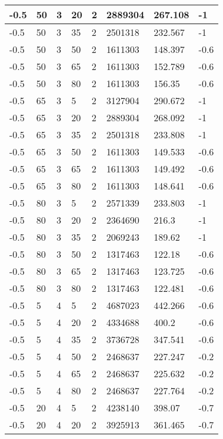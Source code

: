 \begin{longtable}{|p{1.4cm}|p{1.4cm}|p{1.4cm}|p{1.4cm}|p{1.4cm}|p{1.4cm}|p{1.4cm}|p{1.5cm}|}
        -0.5 & 50 & 3 & 20 & 2 & 2889304 & 267.108 & -1 \\ \hline
        -0.5 & 50 & 3 & 35 & 2 & 2501318 & 232.567 & -1 \\ \hline
        -0.5 & 50 & 3 & 50 & 2 & 1611303 & 148.397 & -0.6 \\ \hline
        -0.5 & 50 & 3 & 65 & 2 & 1611303 & 152.789 & -0.6 \\ \hline
        -0.5 & 50 & 3 & 80 & 2 & 1611303 & 156.35 & -0.6 \\ \hline
        -0.5 & 65 & 3 & 5 & 2 & 3127904 & 290.672 & -1 \\ \hline
        -0.5 & 65 & 3 & 20 & 2 & 2889304 & 268.092 & -1 \\ \hline
        -0.5 & 65 & 3 & 35 & 2 & 2501318 & 233.808 & -1 \\ \hline
        -0.5 & 65 & 3 & 50 & 2 & 1611303 & 149.533 & -0.6 \\ \hline
        -0.5 & 65 & 3 & 65 & 2 & 1611303 & 149.492 & -0.6 \\ \hline
        -0.5 & 65 & 3 & 80 & 2 & 1611303 & 148.641 & -0.6 \\ \hline
        -0.5 & 80 & 3 & 5 & 2 & 2571339 & 233.803 & -1 \\ \hline
        -0.5 & 80 & 3 & 20 & 2 & 2364690 & 216.3 & -1 \\ \hline
        -0.5 & 80 & 3 & 35 & 2 & 2069243 & 189.62 & -1 \\ \hline
        -0.5 & 80 & 3 & 50 & 2 & 1317463 & 122.18 & -0.6 \\ \hline
        -0.5 & 80 & 3 & 65 & 2 & 1317463 & 123.725 & -0.6 \\ \hline
        -0.5 & 80 & 3 & 80 & 2 & 1317463 & 122.481 & -0.6 \\ \hline
        -0.5 & 5 & 4 & 5 & 2 & 4687023 & 442.266 & -0.6 \\ \hline
        -0.5 & 5 & 4 & 20 & 2 & 4334688 & 400.2 & -0.6 \\ \hline
        -0.5 & 5 & 4 & 35 & 2 & 3736728 & 347.541 & -0.6 \\ \hline
        -0.5 & 5 & 4 & 50 & 2 & 2468637 & 227.247 & -0.2 \\ \hline
        -0.5 & 5 & 4 & 65 & 2 & 2468637 & 225.632 & -0.2 \\ \hline
        -0.5 & 5 & 4 & 80 & 2 & 2468637 & 227.764 & -0.2 \\ \hline
        -0.5 & 20 & 4 & 5 & 2 & 4238140 & 398.07 & -0.7 \\ \hline
        -0.5 & 20 & 4 & 20 & 2 & 3925913 & 361.465 & -0.7 \\ \hline

\end{longtable}
